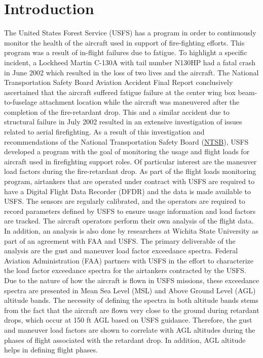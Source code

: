 \documentclass[conf]{new-aiaa}
\begin{document}
\section{Introduction}
The United States Forest Service (USFS) has a program in order to continuously monitor the health of the aircraft used in support of fire-fighting efforts.  This program was a result of in-flight failures due to fatigue.  To highlight a specific incident, a Lockheed Martin C-130A with tail number N130HP had a fatal crash in June 2002 which resulted in the loss of two lives and the aircraft. The National Transportation Safety Board Aviation Accident Final Report conclusively ascertained that the aircraft suffered fatigue failure at the center wing box beam-to-fuselage attachment location while the aircraft was maneuvered after the completion of the fire-retardant drop. This and a similar accident due to structural failure in July 2002 resulted in an extensive investigation of issues related to aerial firefighting.  As a result of this investigation and recommendations of the National Transportation Safety Board (\href{https://www.baaa-acro.com/sites/default/files/2021-03/N130HP.pdf}{NTSB}), USFS developed a program with the goal of monitoring the usage and flight loads for aircraft used in firefighting support roles.  Of particular interest are the maneuver load factors during the fire-retardant drop. As part of the flight loads monitoring program, airtankers that are operated under contract with USFS are required to have a Digital Flight Data Recorder (DFDR) and the data is made available to USFS.  The sensors are regularly calibrated, and the operators are required to record parameters defined by USFS to ensure usage information and load factors are tracked.  The aircraft operators perform their own analysis of the flight data.  In addition, an analysis is also done by researchers at Wichita State University as part of an agreement with FAA and USFS.  The primary deliverable of the analysis are the gust and maneuver load factor exceedance spectra.  Federal Aviation Administration (FAA) partners with USFS in the effort to characterize the load factor exceedance spectra for the airtankers contracted by the USFS. Due to the nature of how the aircraft is flown in USFS missions, these exceedance spectra are presented in Mean Sea Level (MSL) and Above Ground Level (AGL) altitude bands.  The necessity of defining the spectra in both altitude bands stems from the fact that the aircraft are flown very close to the ground during retardant drops, which occur at 150 ft AGL based on USFS guidance.  Therefore, the gust and maneuver load factors are shown to correlate with AGL altitudes during the phases of flight associated with the retardant drop.  In addition, AGL altitude helps in defining flight phases. 
\end{document}
